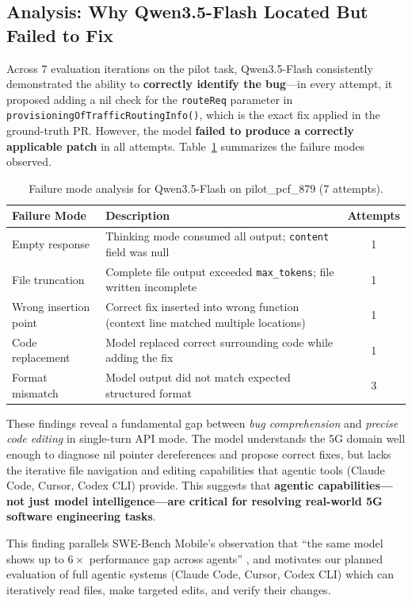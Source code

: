 \documentclass{article}
\begin{document}
\subsection{Analysis: Why Qwen3.5-Flash Located But Failed to Fix}

Across 7 evaluation iterations on the pilot task, Qwen3.5-Flash consistently demonstrated the ability to \textbf{correctly identify the bug}---in every attempt, it proposed adding a nil check for the \texttt{routeReq} parameter in \texttt{provisioningOfTrafficRoutingInfo()}, which is the exact fix applied in the ground-truth PR. However, the model \textbf{failed to produce a correctly applicable patch} in all attempts. Table~\ref{tab:failure_modes} summarizes the failure modes observed.

\begin{table}[h]
\centering
\caption{Failure mode analysis for Qwen3.5-Flash on pilot\_pcf\_879 (7 attempts).}
\label{tab:failure_modes}
\begin{tabular}{lp{7cm}c}
\toprule
\textbf{Failure Mode} & \textbf{Description} & \textbf{Attempts} \\
\midrule
Empty response & Thinking mode consumed all output; \texttt{content} field was null & 1 \\
File truncation & Complete file output exceeded \texttt{max\_tokens}; file written incomplete & 1 \\
Wrong insertion point & Correct fix inserted into wrong function (context line matched multiple locations) & 1 \\
Code replacement & Model replaced correct surrounding code while adding the fix & 1 \\
Format mismatch & Model output did not match expected structured format & 3 \\
\bottomrule
\end{tabular}
\end{table}

These findings reveal a fundamental gap between \emph{bug comprehension} and \emph{precise code editing} in single-turn API mode. The model understands the 5G domain well enough to diagnose nil pointer dereferences and propose correct fixes, but lacks the iterative file navigation and editing capabilities that agentic tools (Claude Code, Cursor, Codex CLI) provide. This suggests that \textbf{agentic capabilities---not just model intelligence---are critical for resolving real-world 5G software engineering tasks}.

This finding parallels SWE-Bench Mobile's observation that ``the same model shows up to $6\times$ performance gap across agents'' \citep{yao2025swebenchmobile}, and motivates our planned evaluation of full agentic systems (Claude Code, Cursor, Codex CLI) which can iteratively read files, make targeted edits, and verify their changes.
\end{document}
